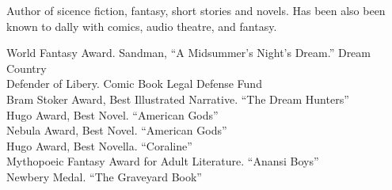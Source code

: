 \documentclass{xetexCV}
\begin{document}
\makecvtitle

Author of sicence fiction, fantasy, short stories and novels.  Has been also been known to dally with comics, audio theatre, and fantasy.

World Fantasy Award. Sandman, ``A Midsummer's Night's Dream.''  Dream Country \\
Defender of Libery.  Comic Book Legal Defense Fund \\
Bram Stoker Award, Best Illustrated Narrative.  ``The Dream Hunters''  \\
Hugo Award, Best Novel.  ``American Gods''  \\
Nebula Award, Best Novel.  ``American Gods'' \\
Hugo Award, Best Novella.  ``Coraline''  \\
Mythopoeic Fantasy Award for Adult Literature.  ``Anansi Boys'' \\
Newbery Medal.  ``The Graveyard Book'' 

\nocite{*}

\end{document}
